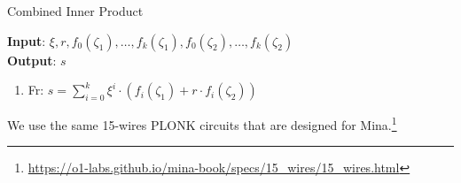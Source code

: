 \begin{algorithm}[H]
    \caption{Combined Inner Product}
    \textbf{Input}: $\xi, r, f_0(\zeta_1), \dots, f_k(\zeta_1), f_0(\zeta_2), \dots, f_k(\zeta_2)$ \\ %
    \textbf{Output}: $s$
    \begin{enumerate}
        \item Fr: $s = \sum\limits_{i = 0}^{k} \xi^i \cdot (f_i(\zeta_1) + r \cdot f_i(\zeta_2))$
    \end{enumerate}
\end{algorithm}

We use the same 15-wires PLONK circuits that are designed for Mina.\footnote{\url{https://o1-labs.github.io/mina-book/specs/15_wires/15_wires.html}}